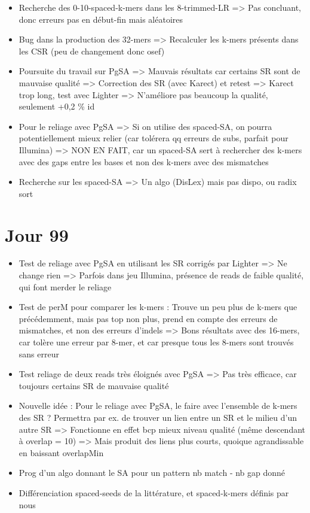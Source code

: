 \documentclass[12pt]{report}
\begin{document}
\begin{itemize}
	\item Recherche des 0-10-spaced-k-mers dans les 8-trimmed-LR => Pas concluant, donc erreurs pas en début-fin
		  mais aléatoires
	
	\item Bug dans la production des 32-mers => Recalculer les k-mers présents dans les CSR (peu de changement donc osef)
	
	\item Poursuite du travail sur PgSA => Mauvais résultats car certains SR sont de mauvaise qualité
		  => Correction des SR (avec Karect) et retest
		  => Karect trop long, test avec Lighter => N'améliore pas beaucoup la qualité, seulement +0,2 \% id
		 
	\item Pour le reliage avec PgSA => Si on utilise des spaced-SA, on pourra potentiellement mieux relier
		  (car tolérera qq erreurs de subs, parfait pour Illumina)
		  => NON EN FAIT, car un spaced-SA sert à rechercher des k-mers avec des gaps entre les bases 
		  et non des k-mers avec des mismatches
		  
	\item Recherche sur les spaced-SA => Un algo (DisLex) mais pas dispo, ou radix sort
\end{itemize}

\section{Jour 99}

\begin{itemize}
	\item Test de reliage avec PgSA en utilisant les SR corrigés par Lighter => Ne change rien
		  => Parfois dans jeu Illumina, présence de reads de faible qualité, qui font merder le reliage
		  
	\item Test de perM pour comparer les k-mers : Trouve un peu plus de k-mers que précédemment, mais pas top
		  non plus, prend en compte des erreurs de mismatches, et non des erreurs d'indels
		  => Bons résultats avec des 16-mers, car tolère une erreur par 8-mer, et car presque tous les 8-mers sont trouvés sans erreur
	
	\item Test reliage de deux reads très éloignés avec PgSA => Pas très efficace, car toujours certains SR 
		  de mauvaise qualité
	
	\item Nouvelle idée : Pour le reliage avec PgSA, le faire avec l'ensemble de k-mers des SR ? Permettra par ex. de trouver un lien
		  entre un SR et le milieu d'un autre SR
		  => Fonctionne en effet bcp mieux niveau qualité (même descendant à overlap = 10)
		  => Mais produit des liens plus courts, quoique agrandissable en baissant overlapMin
		  
	\item Prog d'un algo donnant le SA pour un pattern nb match - nb gap donné
	
	\item Différenciation spaced-seeds de la littérature, et spaced-k-mers définis par nous
\end{itemize}
\end{document}
